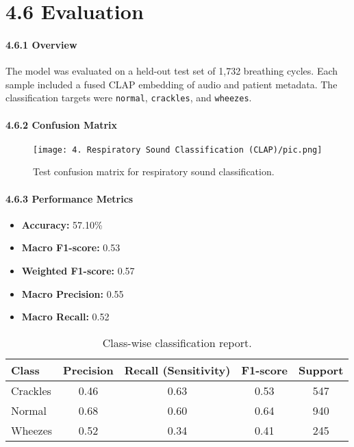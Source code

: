 \section*{4.6 Evaluation}
\paragraph{4.6.1 Overview\\}
The model was evaluated on a held-out test set of 1,732 breathing cycles. Each sample included a fused CLAP embedding of audio and patient metadata. The classification targets were \texttt{normal}, \texttt{crackles}, and \texttt{wheezes}.

\paragraph{4.6.2 Confusion Matrix\\}
\begin{figure}[htbp]
    \centering
    \texttt{[image: 4. Respiratory Sound Classification (CLAP)/pic.png]}
    \caption{Test confusion matrix for respiratory sound classification.}
    \label{fig:enter-label}
\end{figure}

\paragraph{4.6.3 Performance Metrics\\}
\begin{itemize}
    \item \textbf{Accuracy:} 57.10\%
    \item \textbf{Macro F1-score:} 0.53
    \item \textbf{Weighted F1-score:} 0.57
    \item \textbf{Macro Precision:} 0.55
    \item \textbf{Macro Recall:} 0.52
\end{itemize}
\begin{table}[htbp]
\centering
\begin{tabular}{|l|c|c|c|c|}
\hline
\textbf{Class} & \textbf{Precision} & \textbf{Recall (Sensitivity)} & \textbf{F1-score} & \textbf{Support} \\
\hline
Crackles & 0.46 & 0.63 & 0.53 & 547 \\
Normal   & 0.68 & 0.60 & 0.64 & 940 \\
Wheezes  & 0.52 & 0.34 & 0.41 & 245 \\
\hline
\end{tabular}
\caption{Class-wise classification report.}
\end{table}


